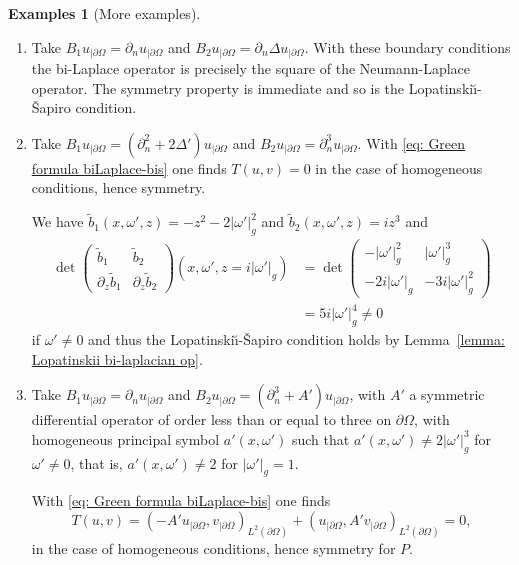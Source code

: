 \documentclass[JEP,XML,SOM,Unicode,published]{cedram}
\theoremstyle{plain}
\theoremstyle{definition}
\newtheorem{examples}[theorem]{Examples}
\newcommand{\LS}{Lopatinski\u{\i}-\v{S}apiro\xspace}
\newcommand{\inp}[2]{(#1, #2)}
\newcommand{\bd}{\ensuremath{_{|\partial\Omega}}}
\begin{document}
\skpt
\begin{examples}[More examples]
\begin{enumerate}

\item Take $B_1 u\bd =\partial_n u\bd$ and $B_2 u\bd
= \partial_n \Delta u\bd$. With these boundary conditions the bi-Laplace operator is precisely
the square of the Neumann-Laplace operator. The symmetry property is
immediate and so is the \LS condition.

\item Take $B_1 u\bd = (\partial_n^2 + 2 \Delta') u\bd$ and $B_2 u\bd
= \partial_n^3 u\bd$. With \eqref{eq: Green formula biLaplace-bis} one finds
$T(u,v) =0$ in the case of homogeneous conditions, hence symmetry.

We have $\tilde{b}_1(x,\omega',z)=-z^2 - 2 |\omega'|_g^2$ and
$\tilde{b}_2(x,\omega',z)=iz^3$ and
\begin{align*}
\det
\begin{pmatrix}
\tilde{b}_1 &\tilde{b}_2 \\[
2pt]
\partial_z\tilde{b}_1& \partial_z\tilde{b}_2
\end{pmatrix} (x,\omega',z=i|\omega'|_g)
&=
\det
\begin{pmatrix}
-|\omega'|_g^2 &|\omega'|^3_g \\[
2pt]
-2 i |\omega'|_g&-3i|\omega'|^2_g
\end{pmatrix} \\
&=5 i |\omega'|^4_g \neq 0
\end{align*}
if $\omega'\neq 0$ and thus the \LS condition holds by Lemma~\ref{lemma: Lopatinskii bi-laplacian op}.

\item Take $B_1 u\bd = \partial_n u\bd$ and $B_2 u\bd
= (\partial_n^3+ A') u\bd$, with $A'$ a symmetric differential
operator of order less than or equal to three on
$\partial \Omega$, with homogeneous principal symbol $a'(x,\omega')$ such that
$a'(x,\omega') \neq 2 |\omega'|_g ^3$ for $\omega' \neq 0$, that
is, $a'(x,\omega')\neq 2$ for $|\omega'|_g=1$.

With \eqref{eq: Green formula biLaplace-bis} one
finds
\begin{equation*}
T(u,v) = \inp{-A' u\bd}{v\bd}_{L^2(\partial\Omega)}
+ \inp{u\bd}{A' v\bd}_{L^2(\partial\Omega)} =0,
\end{equation*}
in the case of homogeneous conditions, hence symmetry for $P$.


\end{enumerate}
\end{examples}
\end{document}
